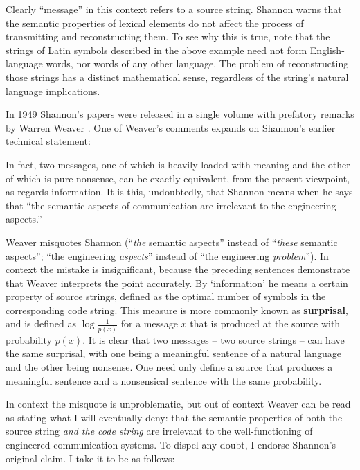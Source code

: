 \noindent Clearly ``message'' in this context refers to a source string.
Shannon warns that the semantic properties of lexical elements do not affect the process of transmitting and reconstructing them.
To see why this is true, note that the strings of Latin symbols described in the above example need not form English-language words, nor words of any other language.
The problem of reconstructing those strings has a distinct mathematical sense, regardless of the string's natural language implications.

In 1949 Shannon's papers were released in a single volume with prefatory remarks by Warren Weaver \citep{shannon1949mathematical}.
One of Weaver's comments expands on Shannon's earlier technical statement:

\begin{myquote}
In fact, two messages, one of which is heavily loaded with meaning and the other of which is pure nonsense, can be exactly equivalent, from the present viewpoint, as regards information. It is this, undoubtedly, that Shannon means when he says that ``the semantic aspects of communication are irrelevant to the engineering aspects.''
\par\hspace*{\fill}\citet[8]{shannon1949mathematical}
\end{myquote}

\noindent Weaver misquotes Shannon (``\emph{the} semantic aspects'' instead of ``\emph{these} semantic aspects''; ``the engineering \textit{aspects}'' instead of ``the engineering \textit{problem}'').
In context the mistake is insignificant, because the preceding sentences demonstrate that Weaver interprets the point accurately.
By `information' he means a certain property of source strings, defined as the optimal number of symbols in the corresponding code string.
This measure is more commonly known as \textbf{surprisal}, and is defined as $\log{\frac{1}{p(x)}}$ for a message $x$ that is produced at the source with probability $p(x)$.
It is clear that two messages -- two source strings -- can have the same surprisal, with one being a meaningful sentence of a natural language and the other being nonsense.
One need only define a source that produces a meaningful sentence and a nonsensical sentence with the same probability.

In context the misquote is unproblematic, but out of context Weaver can be read as stating what I will eventually deny: that the semantic properties of both the source string \textit{and the code string} are irrelevant to the well-functioning of engineered communication systems.
To dispel any doubt, I endorse Shannon's original claim.
I take it to be as follows:

